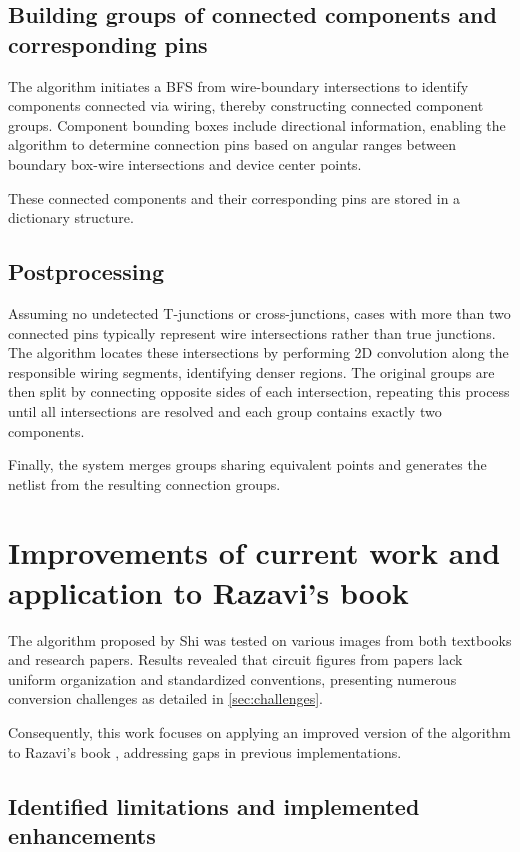 \documentclass{article}
\begin{document}
\subsection{Building groups of connected components and corresponding pins}

The algorithm initiates a BFS from wire-boundary intersections to identify components connected via wiring, thereby constructing connected component groups. 
Component bounding boxes include directional information, enabling the algorithm to determine connection pins based on angular ranges between boundary box-wire intersections and device center points.

These connected components and their corresponding pins are stored in a dictionary structure.

\subsection{Postprocessing}

Assuming no undetected T-junctions or cross-junctions, cases with more than two connected pins typically represent wire intersections rather than true junctions. 
The algorithm locates these intersections by performing 2D convolution along the responsible wiring segments, identifying denser regions. 
The original groups are then split by connecting opposite sides of each intersection, repeating this process until all intersections are resolved and each group contains exactly two components.

Finally, the system merges groups sharing equivalent points and generates the netlist from the resulting connection groups.

\section{Improvements of current work and application to Razavi's book}\label{sec:improvements}

The algorithm proposed by Shi \cite{shi2024amsnet} was tested on various images from both textbooks and research papers. 
Results revealed that circuit figures from papers lack uniform organization and standardized conventions, presenting numerous conversion challenges as detailed in \cref{sec:challenges}.

Consequently, this work focuses on applying an improved version of the algorithm to Razavi's book \cite{razavi2003}, addressing gaps in previous implementations.

\subsection{Identified limitations and implemented enhancements}
\end{document}

